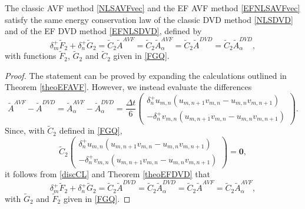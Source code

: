 \documentclass[twoside]{article}
\numberwithin{equation}{section}
\begin{document}
\begin{theorem}
The classic AVF method \eqref{NLSAVFvec} and the EF AVF method \eqref{EFNLSAVFvec} satisfy the same energy conservation law of the classic DVD method  \eqref{NLSDVD} and of the EF DVD method \eqref{EFNLSDVD}, defined by 
$$\delta_m^+ \widetilde{F}_2+\delta_n^+\widetilde{G}_2=\widetilde{{C}}_2\widetilde{A}^{AVF}=\widetilde{{C}}_2\widetilde{A}^{AVF}_\alpha=\widetilde{{C}}_2\widetilde{A}^{DVD}=\widetilde{{C}}_2\widetilde{A}^{DVD}_\alpha,$$
with functions $\widetilde{F}_2$, $\widetilde{G}_2$ and $\widetilde{{C}}_2$ given in \eqref{FGQ}.
\end{theorem}
\begin{proof}
The statement can be proved by expanding the calculations outlined in Theorem \ref{theoEFAVF}. However, we instead evaluate the differences 
$$\widetilde{A}^{AVF}-\widetilde{A}^{DVD}=\widetilde{A}^{AVF}_\alpha-\widetilde{A}^{DVD}_\alpha=\frac{\Delta t}6\left(\begin{array}{c}
\delta_n^+u_{m,n}(u_{m,n+1}v_{m,n}-u_{m,n}v_{m,n+1})\\
-\delta_n^+v_{m,n}(u_{m,n+1}v_{m,n}-u_{m,n}v_{m,n+1})
\end{array}\right).
$$
Since, with $\widetilde C_2$ defined in \eqref{FGQ},
$$\widetilde{C}_2\left(\begin{array}{c}
\delta_n^+u_{m,n}(u_{m,n+1}v_{m,n}-u_{m,n}v_{m,n+1})\\
-\delta_n^+v_{m,n}(u_{m,n+1}v_{m,n}-u_{m,n}v_{m,n+1})
\end{array}\right)=\mathbf{0},$$
it follows from \eqref{discCL} and Theorem \ref{theoEFDVD} that 
$$\delta_m^+ \widetilde{F}_2+\delta_n^+ \widetilde{G}_2=\widetilde{C}_2 \widetilde{A}^{DVD}=\widetilde{C}_2 \widetilde{A}^{DVD}_\alpha=\widetilde{C}_2 \widetilde{A}^{AVF}=\widetilde{C}_2 \widetilde{A}^{AVF}_\alpha,$$
with $\widetilde{G}_2$ and $\widetilde{F}_2$ given in \eqref{FGQ}.
\end{proof}
\end{document}
